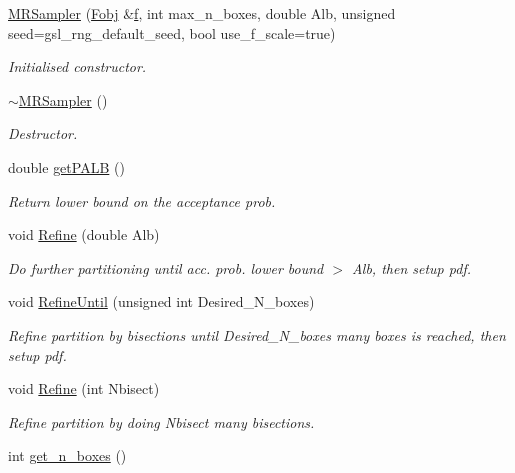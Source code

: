 \begin{DoxyCompactItemize}
\item 
\hyperlink{classMRSampler_a6fc8464ae6da9a1721ff3f437e03d8ef}{\-M\-R\-Sampler} (\hyperlink{classFobj}{\-Fobj} \&\hyperlink{errorfunc_8hpp_aacb77b1211a6ca2e2beff1811cf9ecf4}{f}, int max\-\_\-n\-\_\-boxes, double \-Alb, unsigned seed=gsl\-\_\-rng\-\_\-default\-\_\-seed, bool use\-\_\-f\-\_\-scale=true)
\begin{DoxyCompactList}\small\item\em \-Initialised constructor. \end{DoxyCompactList}\item 
\hyperlink{classMRSampler_ab7fdfefd1123153f759ae4ceb775a10a}{$\sim$\-M\-R\-Sampler} ()
\begin{DoxyCompactList}\small\item\em \-Destructor. \end{DoxyCompactList}\item 
double \hyperlink{classMRSampler_addd59ad1e400adae3c46b562c7ceb80d}{get\-P\-A\-L\-B} ()
\begin{DoxyCompactList}\small\item\em \-Return lower bound on the acceptance prob. \end{DoxyCompactList}\item 
void \hyperlink{classMRSampler_a975802b28786372a0b1ee461184d3b23}{\-Refine} (double \-Alb)
\begin{DoxyCompactList}\small\item\em \-Do further partitioning until acc. prob. lower bound $>$ \-Alb, then setup pdf. \end{DoxyCompactList}\item 
void \hyperlink{classMRSampler_ab6456ed49e2b5a903035ae7ef32cc5f2}{\-Refine\-Until} (unsigned int \-Desired\-\_\-\-N\-\_\-boxes)
\begin{DoxyCompactList}\small\item\em \-Refine partition by bisections until \-Desired\-\_\-\-N\-\_\-boxes many boxes is reached, then setup pdf. \end{DoxyCompactList}\item 
void \hyperlink{classMRSampler_ae72be9880b00d25266c10d2f13365abf}{\-Refine} (int \-Nbisect)
\begin{DoxyCompactList}\small\item\em \-Refine partition by doing \-Nbisect many bisections. \end{DoxyCompactList}\item 
int \hyperlink{classMRSampler_a30f5c5489a08545226b462ace92dc321}{get\-\_\-n\-\_\-boxes} ()

\end{DoxyCompactItemize}

